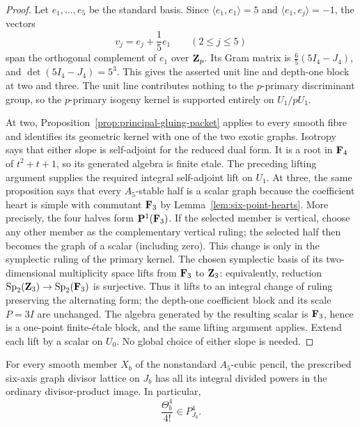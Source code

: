 \begin{proof}
Let \(e_1,\ldots,e_5\) be the standard basis.  Since
\(\langle e_1,e_1\rangle=5\) and \(\langle e_1,e_j\rangle=-1\), the vectors
\[
 v_j=e_j+\frac15e_1\qquad(2\leq j\leq5)
\]
span the orthogonal complement of \(e_1\) over \(\mathbf Z_p\).  Its Gram matrix is
\(\frac65(5I_4-J_4)\), and \(\det(5I_4-J_4)=5^3\).  This gives the asserted
unit line and depth-one block at two and three.  The unit line contributes
nothing to the \(p\)-primary discriminant group, so the \(p\)-primary
isogeny kernel is supported entirely on \(U_1/pU_1\).

At two, Proposition~\ref{prop:principal-gluing-packet} applies to every
smooth fibre and identifies its geometric kernel with one of the two exotic
graphs.  Isotropy says that either slope is self-adjoint for the reduced dual
form.  It is a root in \(\mathbf F_4\) of \(t^2+t+1\), so its generated algebra is
finite etale.  The preceding lifting argument supplies the required integral
self-adjoint lift on \(U_1\).  At three, the same
proposition says that every \(A_5\)-stable half is a scalar graph because the
coefficient heart is simple with commutant \(\mathbf F_3\) by
Lemma~\ref{lem:six-point-hearts}.  More precisely, the
four halves form \(\mathbf P^1(\mathbf F_3)\).  If the selected member is vertical,
choose any other member as the complementary vertical ruling; the selected
half then becomes the graph of a scalar (including zero).  This change is
only in the symplectic ruling of the primary kernel.  The chosen symplectic
basis of its two-dimensional multiplicity space lifts from \(\mathbf F_3\) to
\(\mathbf Z_3\): equivalently, reduction
\(\operatorname{Sp}_2(\mathbf Z_3)\to\operatorname{Sp}_2(\mathbf F_3)\) is surjective.
Thus it lifts to an integral change of ruling preserving the alternating
form; the depth-one coefficient block and its scale \(P=3I\) are unchanged.
The algebra generated by the resulting scalar is
\(\mathbf F_3\), hence is a one-point finite-\'etale block, and the same lifting
argument applies.  Extend each lift by a scalar on \(U_0\).
No global choice of either slope is needed.
\end{proof}

\begin{theorem}
\label{thm:six-axis-divided-powers}
%
%
For every smooth member \(X_b\) of the nonstandard \(A_5\)-cubic pencil, the
prescribed six-axis graph divisor lattice on \(J_b\) has all its integral
divided powers in the ordinary divisor-product image.  In particular,
\begin{equation}
 \frac{\Theta_b^4}{4!}\in P_{J_b}^4.
 \label{eq:six-axis-minimal-class}
\end{equation}
\end{theorem}

